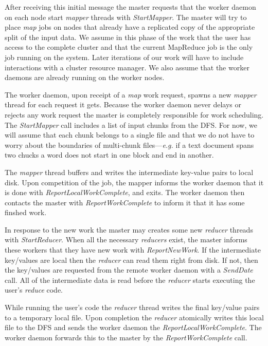\documentclass[10pt,letter,final,article,twocolumn]{article} %
\newcommand{\rpc}[1]{\emph{#1}}
\begin{document}
After receiving this initial message the master requests that the worker daemon on each node start \emph{mapper} threads with \rpc{StartMapper}. The master will try to place \emph{map} jobs on nodes that already have a replicated copy of the appropriate split of the input data.  We assume in this phase of the work that the user has access to the complete cluster and that the current MapReduce job is the only job running on the system. Later iterations of our work will have to include interactions with a cluster resource manager. We also assume that the worker daemons are already running on the worker nodes.

The worker daemon, upon receipt of a \emph{map} work request, spawns a new \emph{mapper} thread for each request it gets. Because the worker daemon never delays or rejects any work request the master is completely responsible for work scheduling. The  \rpc{StartMapper} call includes a list of input chunks from the DFS. For now, we will assume that each chunk belongs to a single file and that we do not have to worry about the boundaries of multi-chunk files---\textit{e.g.} if a text document spans two chucks a word does not start in one block and end in another.

The \emph{mapper} thread buffers and writes the intermediate key-value pairs to local disk. Upon competition of the job, the mapper informs the worker daemon that it is done with \rpc{ReportLocalWorkComplete}, and exits. The worker daemon then contacts the master with \rpc{ReportWorkComplete} to inform it that it has some finshed work.

In response to the new work the master may creates some new \emph{reducer} threads with \rpc{StartReducer}. When all the necessary \emph{reducers} exist, the master informs these workers that they have new work with \rpc{ReportNewWork}. If the intermediate key/values  are local then the \emph{reducer} can read them right from disk. If not, then the key/values are requested from the remote worker daemon with a \rpc{SendDate} call. All of the intermediate data is read before the \emph{reducer} starts executing the user's \emph{reduce} code.

While running the user's code the \emph{reducer} thread writes the final key/value pairs to a temporary local file. Upon completion the \emph{reducer} atomically writes this local file to the DFS and sends the worker daemon the \rpc{ReportLocalWorkComplete}. The worker daemon forwards this to the master by the \rpc{ReportWorkComplete} call.
\end{document}

